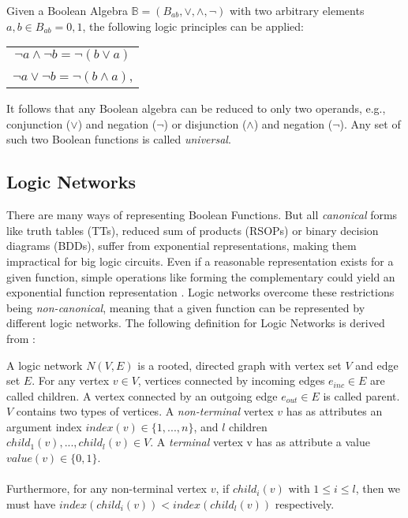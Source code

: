 \begin{definition}
	Given a Boolean Algebra $\mathbb{B} = (B_{ab}, \vee, \wedge, \neg)$ with two arbitrary elements $a,b \in B_{ab} = {0, 1}$, the following logic principles can be applied:
	\begin{table}[h]
		\centering
		\begin{tabular}{c}
			$\neg a \wedge \neg b = \neg (b \vee a)$ \\
			$\neg a \vee \neg b = \neg (b \wedge a)$,
		\end{tabular}
	\end{table}
\end{definition}

It follows that any Boolean algebra can be reduced to only two operands, e.g., conjunction ($\vee$) and negation ($\neg$) or disjunction ($\wedge$) and negation ($\neg$). Any set of such two Boolean functions is called \textit{universal}.

\subsection{Logic Networks}

There are many ways of representing Boolean Functions. But all \textit{canonical} forms like truth tables (TTs), reduced sum of products (RSOPs) or binary decision diagrams (BDDs), suffer from exponential representations, making them impractical for big logic circuits. Even if a reasonable representation exists for a given function, simple operations like forming the complementary could yield an exponential function representation \cite{canonical}. 
Logic networks overcome these restrictions being \textit{non-canonical}, meaning that a given function can be represented by different logic networks. The following definition for Logic Networks is derived from \cite{LogicNetwork}:

\begin{definition}
	A logic network $N(V, E)$ is a rooted, directed graph with vertex set $V$ and edge set $E$. For any vertex $v \in V$, vertices connected by incoming edges $e_{inc} \in E$ are called children. A vertex connected by an outgoing edge $e_{out} \in E$ is called parent.
	$V$ contains two types of vertices. A \textit{non-terminal} vertex $v$ has as attributes an argument index $index(v) \in \{1, . . .,n\}$, and $l$ children $child_1(v), ..., child_l(v) \in V$. 
	A \textit{terminal} vertex v has as attribute a value $value(v)\in\{0,1\}$.\\
	\\
	Furthermore, for any non-terminal vertex $v$, if $child_i(v)$ with $ 1 \leq i \leq l$, then we must have $index(child_i(v)) < index(child_l(v))$ respectively.
\end{definition}

